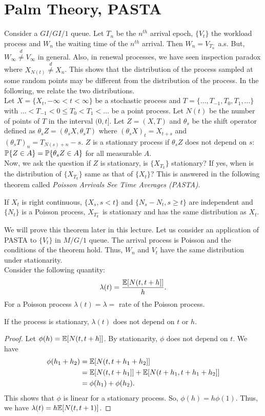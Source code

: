 \documentclass[all-lectures.tex]{subfiles}
\begin{document}
\section{Palm Theory, PASTA}
Consider a $GI/GI/1$ queue. Let $T_n$ be the $n^{th}$ arrival epoch, $\{V_t\}$ the workload process and $W_n$ the waiting time of the $n^{th}$ arrival. Then $W_n = V_{T_n^-}$ a.s. But, $W_\infty \stackrel{d}{\neq} V_\infty$ in general. Also, in renewal processes, we have seen inspection paradox where $X_{N(t)} \stackrel{d}{\neq} X_n$. This shows that the distribution of the process sampled at some random points may be different from the distribution of the process. In the following, we relate the two distributions.\\
\indent Let  $X = \{X_t, -\infty<t<\infty\}$ be a stochastic process and $T = \{\dots,T_{-1},T_{0},T_{1},\dots\}$ with $ \dots <T_{-1}<0\leq T_0 < T_1 < \dots $ be a point process. Let $N(t)$ be the number of points of $T$ in the interval $(0,t]$. Let $Z = (X,T)$ and $\theta_s$ be the shift operator defined as $\theta_s Z = (\theta_s X,\theta_s T)$ where $(\theta_s X)_t = X_{t+s}$ and $(\theta_s T)_n = T_{N(s)+ n} -s$. $Z$ is a stationary process if $\theta_s Z$ does not depend on $s$: $\P\{Z \in A\} = \P\{\theta_s Z \in A\}$ for all measurable $A$. \\
\indent Now, we ask the question if $Z$ is stationary, is $\{X_{T_k}\}$ stationary? If yes, when is the distribution of $\{X_{T_k}\}$ same as that of $\{X_t\}$? This is answered in the following theorem called \textit{Poisson Arrivals See Time Averages (PASTA)}. 
\begin{thm*}[PASTA]
If $X_t$ is right continuous, $\{X_s, s<t\}$ and $\{N_s - N_t, s\geq t\}$ are independent and $\{N_t\}$ is a Poisson process, $X_{T_k^-}$ is stationary and has the same distribution as $X_t$.
\end{thm*}
We will prove this theorem later in this lecture. Let us consider an application of PASTA to $\{V_t\}$ in $M/G/1$ queue. The arrival process is Poisson and the conditions of the theorem hold. Thus, $W_n$ and $V_t$ have the same distribution under stationarity. \\
\indent Consider the following quantity:
\begin{align*}
\lambda(t) = \frac{\E[N(t,t+h] ]}{h}.
\end{align*}
For a Poisson process $\lambda(t) = \lambda = $ rate of the Poisson process. 
\begin{prop}
If the process is stationary, $\lambda(t)$ does not depend on $t$ or $h$. 
\begin{proof}
Let $\phi(h) = \E[N(t,t+h] ]$. By stationarity, $\phi$ does not depend on $t$. We have 
\begin{align*}
\phi(h_1+h_2) &=  \E[N(t,t+h_1+h_2]] \\
&= \E[N(t,t+h_1]]  + \E[N(t+h_1,t+h_1+h_2]] \\
&= \phi(h_1) + \phi(h_2).
\end{align*}
This shows that $\phi$ is linear for a stationary process. So, $\phi(h) = h \phi(1)$. Thus, we have $\lambda(t) = h \E[N(t,t+1)]$.
\end{proof}
\end{prop}
\end{document}
